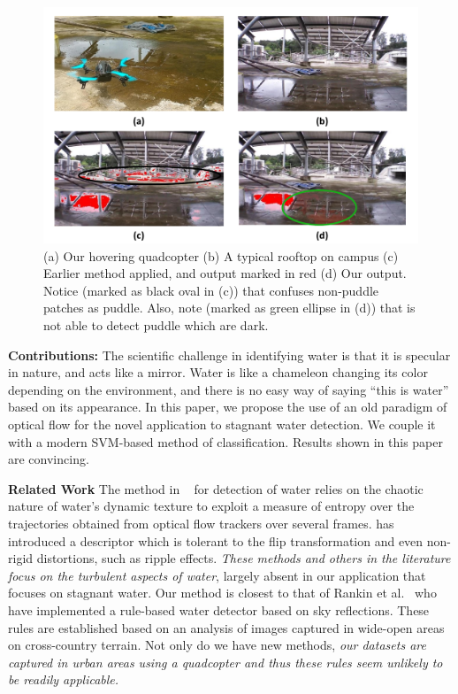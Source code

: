\begin{figure}[h!]
\centering
\includegraphics[width=\linewidth]{figures/stagnantWater/teaser.pdf}
\caption[Overview]{(a) Our hovering quadcopter (b) A
typical rooftop on campus (c) Earlier method \cite{rankin2004daytime} applied, and
  output marked in red (d) Our output. Notice (marked as black oval in
  (c)) that \cite{rankin2004daytime} confuses non-puddle patches as puddle.
  Also, note (marked as green ellipse in (d)) that \cite{rankin2004daytime} is
  not able to detect puddle which are dark.}
\label{fig:stagnantTeaser}  
\end{figure}

\textbf{Contributions:} The scientific challenge in identifying water
is that it is specular in nature, and acts like a mirror.  Water is
like a chameleon changing its color depending on the environment, and
there is no easy way of saying ``this is water'' based on its
appearance. In this paper, we propose the use of an old paradigm of
optical flow for the novel application to stagnant water detection.
We couple it with a modern SVM-based method of classification.
Results shown in this paper are convincing.

\textbf{Related Work} The method in ~\cite{santana12} for detection of
water relies on the chaotic nature of water's dynamic texture to
exploit a measure of entropy over the trajectories obtained from
optical flow trackers over several frames. \cite{zhang10} has
introduced a descriptor which is tolerant to the flip transformation
and even non-rigid distortions, such as ripple effects.  \emph{These
  methods and others in the literature focus on the turbulent aspects
  of water}, largely absent in our application that focuses on
stagnant water.  Our method is closest to that of Rankin et
al.~\cite{rankin2004daytime, rankin11} who have implemented a rule-based water
detector based on sky reflections.  These rules are established
based on an analysis of images captured in wide-open areas on
cross-country terrain. Not only do we have new methods, \emph{our
datasets are captured in urban areas using a quadcopter and thus these
rules seem unlikely to be readily applicable.}

